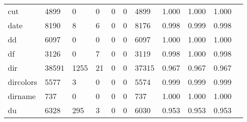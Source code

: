\begin{longtable}{lp{1.10cm}p{1.10cm}p{1.10cm}p{1.10cm}p{1.10cm}p{1.10cm}p{1.10cm}p{1.10cm}p{1.10cm}p{1.10cm}}
cut       &                   4899 &                                  0 &                                 0 &                                0 &                                 0 &                            4899 &                          1.000 &                                 1.000 &                               1.000 \\
date      &                   8190 &                                  8 &                                 6 &                                0 &                                 0 &                            8176 &                          0.998 &                                 0.999 &                               0.998 \\
dd        &                   6097 &                                  0 &                                 0 &                                0 &                                 0 &                            6097 &                          1.000 &                                 1.000 &                               1.000 \\
df        &                   3126 &                                  0 &                                 7 &                                0 &                                 0 &                            3119 &                          0.998 &                                 1.000 &                               0.998 \\
dir       &                  38591 &                               1255 &                                21 &                                0 &                                 0 &                           37315 &                          0.967 &                                 0.967 &                               0.967 \\
dircolors &                   5577 &                                  3 &                                 0 &                                0 &                                 0 &                            5574 &                          0.999 &                                 0.999 &                               0.999 \\
dirname   &                    737 &                                  0 &                                 0 &                                0 &                                 0 &                             737 &                          1.000 &                                 1.000 &                               1.000 \\
du        &                   6328 &                                295 &                                 3 &                                0 &                                 0 &                            6030 &                          0.953 &                                 0.953 &                               0.953 \\

\end{longtable}
